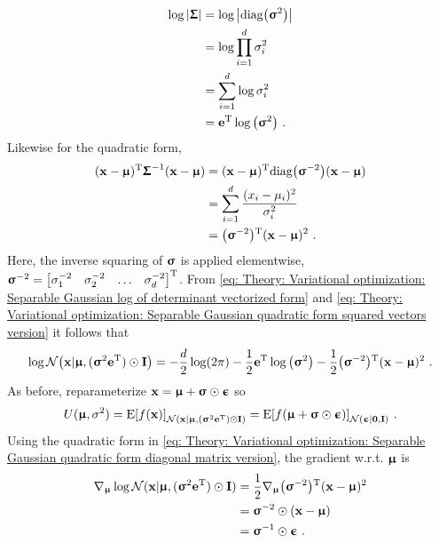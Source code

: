 \begin{align}
    \log{\left\lvert{\boldsymbol{\Upsigma}}\right\rvert}
    &= \log{\left\lvert\text{diag}{\left({\boldsymbol{\upsigma}}^2\right)}\right\rvert}\nonumber\\
    &= \log\prod_{i=1}^d \sigma_i^2\nonumber\\
    &= \sum_{i=1}^d \log\sigma_i^2\nonumber\\
    &= {\mathbf{e}}{^\mathrm{T}}\log{\left({\boldsymbol{\upsigma}}^2\right)} \ .\label{eq: Theory: Variational optimization: Separable Gaussian log of determinant vectorized form}
\end{align}
Likewise for the quadratic form,
\begin{align} %
    (\x-\mub)\transpose\Sigmab^{-1}(\x-\mub)
    &= (\x-\mub)\transpose\text{diag}\pa{\sigmab^{-2}}(\x-\mub)\label{eq: Theory: Variational optimization: Separable Gaussian quadratic form diagonal matrix version}\\
    &= \sum_{i=1}^d \frac{(x_i-\mu_i)^2}{\sigma_i^2}\nonumber\\
    &= \pa{\sigmab^{-2}}\transpose(\x-\mub)^2 \ .\label{eq: Theory: Variational optimization: Separable Gaussian quadratic form squared vectors version}
\end{align}
Here, the inverse squaring of ${\boldsymbol{\upsigma}}$ is applied elementwise, ${\boldsymbol{\upsigma}}^{-2}={\begin{bmatrix}\sigma_1^{-2} & \sigma_2^{-2} & \dots & \sigma_d^{-2}\end{bmatrix}}^\text{T}$. From \eqref{eq: Theory: Variational optimization: Separable Gaussian log of determinant vectorized form} and \eqref{eq: Theory: Variational optimization: Separable Gaussian quadratic form squared vectors version} it follows that
\begin{equation}\label{eq: Theory: Variational optimization: Separable Gaussian log pdf (simplified through vectorization)}
    \log\mathcal{N}{\left({\mathbf{x}}|{\boldsymbol{\upmu}}, ({\boldsymbol{\upsigma}}^2{\mathbf{e}}{^\mathrm{T}})\odot{\mathbf{I}}\right)} = -\frac{d}{2}\log(2\pi) - \frac{1}{2}{\mathbf{e}}{^\mathrm{T}}\log{\left({\boldsymbol{\upsigma}}^2\right)} - \frac{1}{2}{\left({\boldsymbol{\upsigma}}^{-2}\right)}{^\mathrm{T}}({\mathbf{x}}-{\boldsymbol{\upmu}})^2 \ .
\end{equation}
As before, reparameterize ${\mathbf{x}} = {\boldsymbol{\upmu}} + {\boldsymbol{\upsigma}}\odot{\boldsymbol{\upepsilon}}$ so
\begin{equation}
    U({\boldsymbol{\upmu}},\sigma^2) = \text{E}{\left[f({\mathbf{x}})\right]}_{\mathcal{N}({\mathbf{x}}|{{\boldsymbol{\upmu}},({\boldsymbol{\upsigma}}^2{\mathbf{e}}{^\mathrm{T}})\odot{\mathbf{I}}})}  = \text{E}{\left[f({\boldsymbol{\upmu}}+ {\boldsymbol{\upsigma}}\odot{\boldsymbol{\upepsilon}})\right]}_{\mathcal{N}({\boldsymbol{\upepsilon}}|{\mathbf{0}},{\mathbf{I}})} \ .
\end{equation}
Using the quadratic form in \eqref{eq: Theory: Variational optimization: Separable Gaussian quadratic form diagonal matrix version}, the gradient w.r.t. ${\boldsymbol{\upmu}}$ is
\begin{align}\label{eq: Theory: Variational optimization multivariate isotropic gaussian search gradients (mub)}
    \nabla_{\boldsymbol{\upmu}} \log\mathcal{N}({\mathbf{x}}|{\boldsymbol{\upmu}},({\boldsymbol{\upsigma}}^2{\mathbf{e}}{^\mathrm{T}})\odot{\mathbf{I}})
    &= \frac{1}{2}\nabla_{\boldsymbol{\upmu}} {\left({\boldsymbol{\upsigma}}^{-2}\right)}{^\mathrm{T}}({\mathbf{x}}-{\boldsymbol{\upmu}})^2 \nonumber\\
    &= {\boldsymbol{\upsigma}}^{-2} \odot ({\mathbf{x}}-{\boldsymbol{\upmu}}) \nonumber\\
    &= {\boldsymbol{\upsigma}}^{-1} \odot {\boldsymbol{\upepsilon}} \ .
\end{align}
